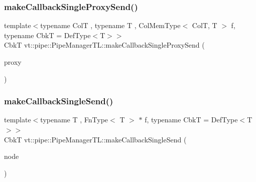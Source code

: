 \mbox{\label{structvt_1_1pipe_1_1_pipe_manager_t_l_a2c8c3a5aca22b2526fe68dd543a8a888}} 
\subsubsection{\texorpdfstring{make\+Callback\+Single\+Proxy\+Send()}{makeCallbackSingleProxySend()}\hspace{0.1cm}{\footnotesize\ttfamily [3/3]}}
{\footnotesize\ttfamily template$<$typename ColT , typename T , Col\+Mem\+Type$<$ Col\+T, T $>$ f, typename CbkT  = Def\+Type$<$\+T$>$$>$ \\
CbkT vt\+::pipe\+::\+Pipe\+Manager\+T\+L\+::make\+Callback\+Single\+Proxy\+Send (\begin{DoxyParamCaption}\item[{typename Col\+T\+::\+Proxy\+Type}]{proxy }\end{DoxyParamCaption})}

\mbox{\label{structvt_1_1pipe_1_1_pipe_manager_t_l_a8776a3e14cce177c3b31aed347177750}} 
\subsubsection{\texorpdfstring{make\+Callback\+Single\+Send()}{makeCallbackSingleSend()}\hspace{0.1cm}{\footnotesize\ttfamily [1/2]}}
{\footnotesize\ttfamily template$<$typename T , Fn\+Type$<$ T $>$ $\ast$ f, typename CbkT  = Def\+Type$<$\+T$>$$>$ \\
CbkT vt\+::pipe\+::\+Pipe\+Manager\+T\+L\+::make\+Callback\+Single\+Send (\begin{DoxyParamCaption}\item[{\hyperlink{namespacevt_a866da9d0efc19c0a1ce79e9e492f47e2}{Node\+Type} const \&}]{node }\end{DoxyParamCaption})}

